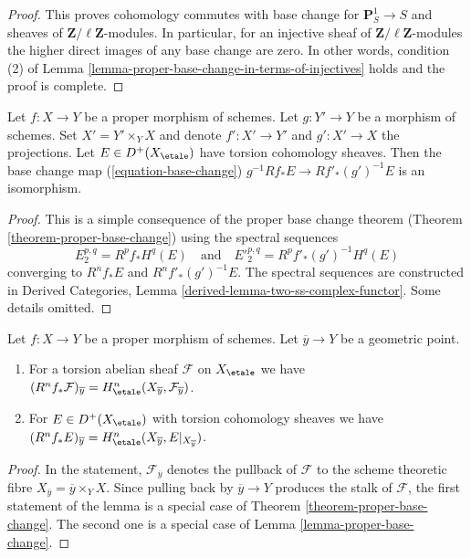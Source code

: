 \begin{proof}
\medskip\noindent
This proves cohomology commutes with base change for
$\mathbf{P}^1_S \to S$ and sheaves of $\mathbf{Z}/\ell\mathbf{Z}$-modules.
In particular, for an injective sheaf of $\mathbf{Z}/\ell\mathbf{Z}$-modules
the higher direct images of any base change are zero.
In other words, condition (2) of
Lemma \ref{lemma-proper-base-change-in-terms-of-injectives}
holds and the proof is complete.
\end{proof}

\begin{lemma}
\label{lemma-proper-base-change}
Let $f : X \to Y$ be a proper morphism of schemes. Let $g : Y' \to Y$ be
a morphism of schemes. Set $X' = Y' \times_Y X$ and denote
$f' : X' \to Y'$ and $g' : X' \to X$ the projections.
Let $E \in D^+(X_\etale)$ have torsion cohomology sheaves.
Then the base change map (\ref{equation-base-change})
$g^{-1}Rf_*E \to Rf'_*(g')^{-1}E$
is an isomorphism.
\end{lemma}

\begin{proof}
This is a simple consequence of the proper base change theorem
(Theorem \ref{theorem-proper-base-change}) using the spectral
sequences
$$
E_2^{p, q} = R^pf_*H^q(E)
\quad\text{and}\quad
{E'}_2^{p, q} = R^pf'_*(g')^{-1}H^q(E)
$$
converging to $R^nf_*E$ and $R^nf'_*(g')^{-1}E$.
The spectral sequences are constructed in
Derived Categories, Lemma \ref{derived-lemma-two-ss-complex-functor}.
Some details omitted.
\end{proof}

\begin{lemma}
\label{lemma-proper-base-change-stalk}
Let $f : X \to Y$ be a proper morphism of schemes. Let $\overline{y} \to Y$
be a geometric point.
\begin{enumerate}
\item For a torsion abelian sheaf $\mathcal{F}$ on $X_\etale$ we have
$(R^nf_*\mathcal{F})_{\overline{y}} =
H^n_\etale(X_{\overline{y}}, \mathcal{F}_{\overline{y}})$.
\item For $E \in D^+(X_\etale)$ with torsion cohomology sheaves we have
$(R^nf_*E)_{\overline{y}} =
H^n_\etale(X_{\overline{y}}, E|_{X_{\overline{y}}})$.
\end{enumerate}
\end{lemma}

\begin{proof}
In the statement, $\mathcal{F}_{\overline{y}}$ denotes the pullback
of $\mathcal{F}$ to the scheme theoretic fibre
$X_{\overline{y}} = \overline{y} \times_Y X$.
Since pulling back by $\overline{y} \to Y$ produces the
stalk of $\mathcal{F}$, the first statement of the lemma
is a special case of Theorem \ref{theorem-proper-base-change}.
The second one is a special case of Lemma \ref{lemma-proper-base-change}.
\end{proof}






